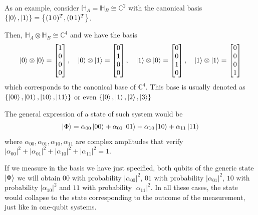 \begin{ejemplo}\label{ex: 2-qubit basis}
    As an example, consider $\mathbb{H}_A=\mathbb{H}_B \cong \mathbb{C}^2$ with the canonical basis $\left\lbrace \ket{0}, \ket{1} \right\rbrace=\left \lbrace (1\, 0)^T, (0\, 1)^T\right\rbrace$. 

    Then, $\mathbb{H}_A \otimes \mathbb{H}_B  \cong \mathbb{C}^4$ and we have the basis
    \begin{equation}
        \ket{0} \otimes \ket{0}=\begin{bmatrix} 1\\ 0\\ 0\\ 0 \end{bmatrix}, \quad 
        \ket{0} \otimes \ket{1}=\begin{bmatrix} 0\\ 1\\ 0\\ 0 \end{bmatrix}, \quad
        \ket{1} \otimes \ket{0}=\begin{bmatrix} 0\\ 0\\ 1\\ 0 \end{bmatrix}, \quad
        \ket{1} \otimes \ket{1}=\begin{bmatrix} 0\\ 0\\ 0\\ 1 \end{bmatrix}
    \end{equation}
    which corresponds to the canonical base of $\mathbb{C}^4$. This base is usually denoted as $\left\lbrace \ket{00}, \ket{01}, \ket{10}, \ket{11}\right \rbrace$ or even $\left \lbrace \ket{0}, \ket{1}, \ket{2}, \ket{3} \right\rbrace$ 

    The general expression of a state of such system would be
    $$\ket{\Phi}= \alpha_{00}\ket{00} + \alpha_{01}\ket{01} + \alpha_{10}\ket{10} + \alpha_{11}\ket{11}$$
    where $\alpha_{00}, \alpha_{01}, \alpha_{10}, \alpha_{11}$ are complex amplitudes that verify ${|\alpha_{00}|^2+ |\alpha_{01}|^2+ |\alpha_{10}|^2+ |\alpha_{11}|^2 = 1}$. 

    If we measure in the basis we have just specified, both qubits of the generic state $\ket{\Phi}$ we will obtain $00$ with probability $|\alpha_{00}|^2$, $01$ with probability $|\alpha_{01}|^2$,  $10$ with probability $|\alpha_{10}|^2$ and $11$ with probability $|\alpha_{11}|^2$. In all these cases, the state would collapse to the state corresponding to the outcome of the measurement, just like in one-qubit systems.


\end{ejemplo}
